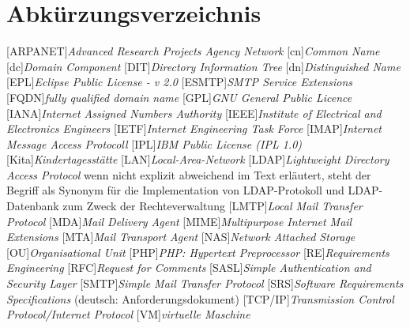 
\chapter*{Abkürzungsverzeichnis}

\begin{acronym}[ARPANET]
[ARPANET]{\textit{Advanced Research Projects Agency Network}}
[cn]{\textit{Common Name}}
[dc]{\textit{Domain Component}}
[DIT]{\textit{Directory Information Tree}}
[dn]{\textit{Distinguished Name}}
[EPL]{\textit{Eclipse Public License - v 2.0}}
[ESMTP]{\textit{SMTP Service Extensions}}
[FQDN]{\textit{fully qualified domain name}}
[GPL]{\textit{GNU General Public Licence}}
[IANA]{\textit{Internet Assigned Numbers Authority}}
[IEEE]{\textit{Institute of Electrical and Electronics Engineers}}
[IETF]{\textit{Internet Engineering Task Force}}
[IMAP]{\textit{Internet Message Access Protocoll}}
[IPL]{\textit{IBM Public License (IPL 1.0)}}
[Kita]{\textit{Kindertagesstätte}}
[LAN]{\textit{Local-Area-Network}}
[LDAP]{\textit{Lightweight Directory Access Protocol}}
wenn nicht explizit abweichend im Text erläutert, steht der Begriff als Synonym für die Implementation von LDAP-Protokoll und LDAP-Datenbank zum Zweck der Rechteverwaltung
[LMTP]{\textit{Local Mail Transfer Protocol}}
[MDA]{\textit{Mail Delivery Agent}}
[MIME]{\textit{Multipurpose Internet Mail Extensions}}
[MTA]{\textit{Mail Transport Agent}}
[NAS]{\textit{Network Attached Storage}}
[OU]{\textit{Organisational Unit}}
[PHP]{\textit{PHP: Hypertext Preprocessor}}
[RE]{\textit{Requirements Engineering}}
[RFC]{\textit{Request for Comments}}
[SASL]{\textit{Simple Authentication and Security Layer}}
[SMTP]{\textit{Simple Mail Transfer Protocol}}
[SRS]{\textit{Software Requirements Specifications}} 
(deutsch: Anforderungsdokument)
[TCP/IP]{\textit{Transmission Control Protocol/Internet Protocol}}
[VM]{\textit{virtuelle Maschine}}
\end{acronym}